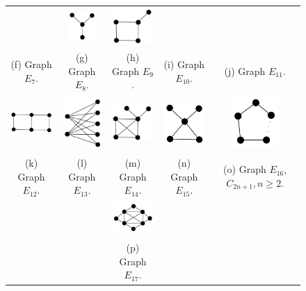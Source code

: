 \begin{figure}[htb]
\begin{tabular}{  c c c c  c}
    & 
    \includegraphics[width=1cm]{img/e10.png} 
    & 
    \includegraphics[width=1.8cm]{img/e11.png} 
    \\ %
    \footnotesize 
    (f)  \footnotesize Graph $E_7$. 
    & 
    \footnotesize (g) Graph $E_8$.
    & 
    \footnotesize (h) Graph $E_9$.
    & 
    \footnotesize (i) Graph $E_{10}$.
    & 
    \footnotesize (j) Graph $E_{11}$.
    \\%
        \includegraphics[width=2.5cm]{img/e12.png} 
    & 
    \includegraphics[width=2cm]{img/k25.png} 
    & 
    \includegraphics[width=2cm]{img/e14.png} 
    & 
    \includegraphics[width=1.8cm]{img/e15.png} 
    & 
    \includegraphics[width=1.8cm]{img/c2n+1.png} 
    \\ %
    \footnotesize 
    (k)  \footnotesize Graph $E_{12}$. 
    & 
    \footnotesize (l) Graph $E_{13}$.
    & 
    \footnotesize (m) Graph  $E_{14}$.
    & 
    \footnotesize (n) Graph $E_{15}$.
    & 
    \footnotesize (o)  Graph $E_{16}$,  $C_{2n+1},n\geq2$.
    \\
    &&\includegraphics[width=2.5cm]{img/4sunNoLabel.png}&&
    \\
    &&\footnotesize (p)  Graph $E_{17}$.&&
    

\end{tabular}
\end{figure}

